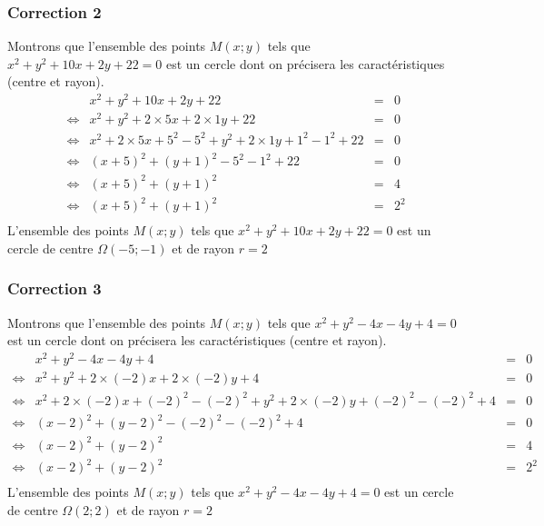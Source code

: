 \documentclass[15pt, mathserif]{beamer}
\begin{document}
\begin{frame}
\vspace{-10mm}
	\frametitle{Correction 2}
Montrons que l'ensemble des points $M(x; y)$ tels que $x^2+y^2+10x+2y+22=0$ est un cercle dont on précisera les caractéristiques (centre et rayon). 
 $$\begin{array}{crcl} 
 & x^2+y^2+10x+2y+22& = & 0 \\ 
 \Leftrightarrow & x^2+y^2+2 \times5x+2 \times 1y+22 & = & 0 \\ 
 \Leftrightarrow & x^2+2 \times5x+ 5^2-5^2+y^2+2 \times 1y + 1^2-1^2+22 & = & 0 \\ 
 \Leftrightarrow & (x+5)^2+(y+1)^2-5^2-1^2+22 & = & 0 \\ 
 \Leftrightarrow & (x+5)^2+(y+1)^2 & = & 4 \\ 
 \Leftrightarrow & (x+5)^2+(y+1)^2 & = & 2^2 \\ 
 \end{array}$$ 
 L'ensemble des points $M(x; y)$ tels que $x^2+y^2+10x+2y+22=0$ est un cercle de centre $\Omega(-5;-1)$ et de rayon $r =2$\end{frame}


\begin{frame}
\vspace{-10mm}
	\frametitle{Correction 3}
Montrons que l'ensemble des points $M(x; y)$ tels que $x^2+y^2-4x-4y+4=0$ est un cercle dont on précisera les caractéristiques (centre et rayon). 
 $$\begin{array}{crcl} 
 & x^2+y^2-4x-4y+4& = & 0 \\ 
 \Leftrightarrow & x^2+y^2+2 \times\left(-2\right)x+2 \times \left(-2\right)y+4 & = & 0 \\ 
 \Leftrightarrow & x^2+2 \times\left(-2\right)x+ \left(-2\right)^2-\left(-2\right)^2+y^2+2 \times \left(-2\right)y + \left(-2\right)^2-\left(-2\right)^2+4 & = & 0 \\ 
 \Leftrightarrow & (x-2)^2+(y-2)^2-\left(-2\right)^2-\left(-2\right)^2+4 & = & 0 \\ 
 \Leftrightarrow & (x-2)^2+(y-2)^2 & = & 4 \\ 
 \Leftrightarrow & (x-2)^2+(y-2)^2 & = & 2^2 \\ 
 \end{array}$$ 
 L'ensemble des points $M(x; y)$ tels que $x^2+y^2-4x-4y+4=0$ est un cercle de centre $\Omega(2;2)$ et de rayon $r =2$\end{frame}
\end{document}

